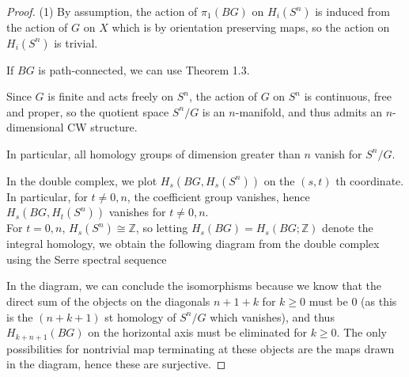 \documentclass[reqno]{amsart}
\theoremstyle{definition}
\theoremstyle{remark}
\begin{document}
    \begin{proof}
        (1) By assumption, the action of
        $\pi_1 (BG)$ on
        $H_i (S^{n})$ is induced from the action
        of $G$ on $X$ which is by orientation
        preserving maps, so the action on
        $H_i(S^{n})$ is trivial.

        If $BG$ is path-connected, we can use Theorem 1.3.

        Since $G$ is finite and acts freely
        on $S^{n}$, the
        action of $G$ on $S^{n}$ is continuous, free and
        proper, so the quotient space
        $S^{n} / G$ is an $n$-manifold, and thus
        admits an $n$-dimensional CW structure. 

        In particular, all homology groups
        of dimension greater than $n$ vanish
        for $S^{n} /G$.

        
        In the double complex,
        we plot 
        $H_s(BG,H_s(S^{n}))$ on
        the $(s,t)$ th coordinate.
        In particular,
        for $t \neq 0,n$, the coefficient group
        vanishes, hence 
        $H_s(BG, H_t(S^{n}))$ vanishes
        for $t \neq 0,n$.\\
        For $t = 0,n$, $H_s(S^{n}) \cong \mathbb{Z}$, so
        letting
        $H_s(BG) = H_s (BG; \mathbb{Z})$ denote the
        integral homology, we obtain the following
        diagram from
        the double complex using the Serre spectral sequence

In the diagram, we can conclude the isomorphisms because
we know that the direct sum of the
objects on the diagonals $n+1+k$ for $k\ge 0$
must be $0$ (as this is the
$(n+k+1)$ st homology of
$S^{n} / G$ which vanishes), and thus
$H_{k+n+1}(BG)$ on the horizontal axis must
be eliminated for $k\ge 0$. The only possibilities
for nontrivial map terminating at
these objects are the maps drawn in the diagram, hence
these are surjective.


\end{proof}
\end{document}
